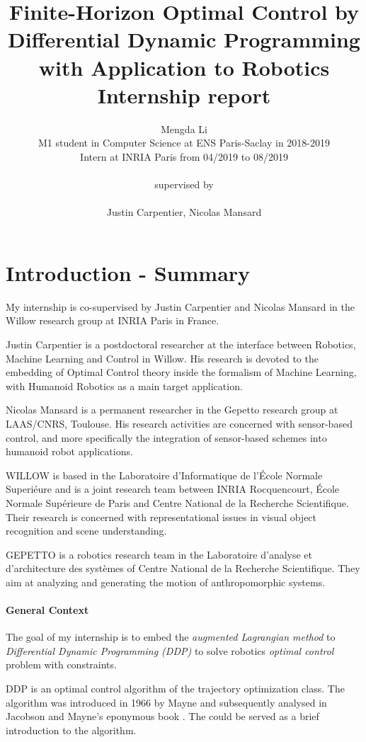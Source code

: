 \documentclass{report}
\title{Finite-Horizon Optimal Control by Differential Dynamic Programming with Application to Robotics 	\\
\medskip
\large Internship report
}
\author{Mengda Li\\
\small M1 student in Computer Science at ENS Paris-Saclay in 2018-2019 \\
\small Intern at INRIA Paris from 04/2019 to 08/2019\\
\\
\normalsize supervised by\\
\\
Justin Carpentier, Nicolas Mansard
}
\date{}
\begin{document}
\maketitle
\tableofcontents

\chapter*{Introduction - Summary}

My internship is co-supervised by Justin Carpentier and Nicolas Mansard in the Willow research group at INRIA Paris in France. 

Justin Carpentier is a postdoctoral researcher at the interface between Robotics, Machine Learning and Control in Willow. His research is devoted to the embedding of Optimal Control theory inside the formalism of Machine Learning, with Humanoid Robotics as a main target application.  

Nicolas Mansard is a permanent researcher in the Gepetto research group at LAAS/CNRS, Toulouse. His research activities are concerned with sensor-based control, and more specifically the integration of sensor-based schemes into humanoid robot applications. 

WILLOW is based in the Laboratoire d'Informatique de l'École Normale Superiéure and is a joint research team between INRIA Rocquencourt, École Normale Supérieure de Paris and Centre National de la Recherche Scientifique. 
Their research is concerned with representational issues in visual object recognition and scene understanding. 

GEPETTO is a robotics research team in the Laboratoire d'analyse et d'architecture des systèmes of Centre National de la Recherche Scientifique. They aim at analyzing and generating the motion of anthropomorphic systems. 

\subsubsection{General Context}
The goal of my internship is to embed the \emph{augmented Lagrangian method} to \emph{Differential Dynamic Programming (DDP)} to solve robotics \emph{optimal control} problem with constraints. 

DDP is an optimal control algorithm of the trajectory optimization class. The algorithm was introduced in 1966 by Mayne and subsequently analysed in Jacobson and Mayne's eponymous book \cite{jacobson1970}. The \cite{TassaIROS12} could be served as a brief introduction to the algorithm.
\end{document}
